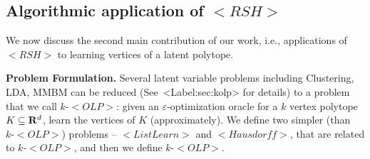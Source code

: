 \documentclass[11pt,letterpaper]{article}
\newcounter{note}[section]
\def\mathsf#1{<#1>}%
\def\xspace{}%
\def\Cref#1{<Label:#1>}%
\theoremstyle{definition}
\newtheorem{defn}[theorem]{Definition}
\theoremstyle{remark}
\newcommand{\rsh}{{\mathsf {RSH}}\xspace}
\newcommand{\olp}{{\mathsf {OLP}}\xspace}
\newcommand{\kolp}{k\mbox{-}\olp}
\newcommand{\ListLearn}{\mathsf {ListLearn}\xspace}
\newcommand{\Hausdorf}{\mathsf {Hausdorff}\xspace }
\begin{document}





\subsection{Algorithmic application of $\rsh$}\label{algorithmic-rsh}
We now discuss the second main contribution of our work, i.e., applications of $\rsh$ to learning vertices of a latent polytope.

\vspace*{0.1 in}
\noindent
{\bf Problem Formulation.}
Several latent variable problems including Clustering, LDA, MMBM can be reduced 
(See~\Cref{sec:kolp} for details) to a problem that we call $\kolp$: given an $\varepsilon$-optimization oracle for a $k$ vertex polytope $K\subseteq {\bf R}^d$, learn the vertices of $K$ (approximately). 
We define two simpler (than $\kolp$) problems -- $\ListLearn$ and $\Hausdorf$, that are related to $\kolp$, and then we define $\kolp$. 

\end{document}
